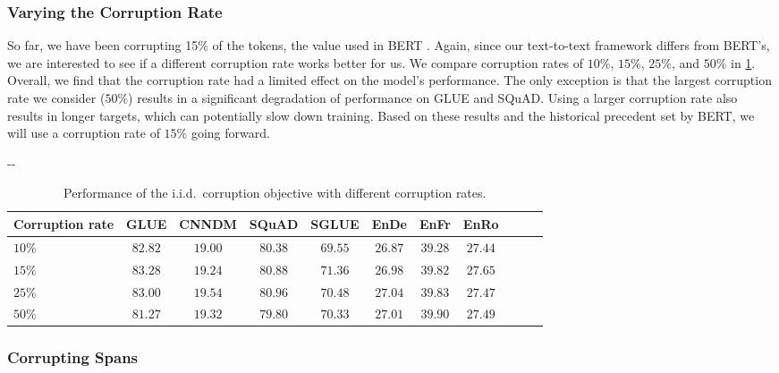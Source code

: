 \documentclass[twoside,11pt]{article}
\newlength{\offsetpage}
\newenvironment{widepage}{\begin{adjustwidth}{-\offsetpage}{-\offsetpage}
    \addtolength{\textwidth}{2\offsetpage}}
{\end{adjustwidth}}
\newcommand{\bsl}{\makebox[0pt][r]{\raisebox{0.05em}{$\bigstar\,$}}}
\def\*#1{\mathbf{#1}}
\begin{document}
\subsubsection{Varying the Corruption Rate}
\label{sec:corruption_rate}

So far, we have been corrupting 15\% of the tokens, the value used in BERT \citep{devlin2018bert}.
Again, since our text-to-text framework differs from BERT's, we are interested to see if a different corruption rate works better for us.
We compare corruption rates of $10\%$, $15\%$, $25\%$, and $50\%$ in \cref{tab:objectives_rate}.
Overall, we find that the corruption rate had a limited effect on the model's performance.
The only exception is that the largest corruption rate we consider ($50\%$) results in a significant degradation of performance on GLUE and SQuAD.
Using a larger corruption rate also results in longer targets, which can potentially slow down training.
Based on these results and the historical precedent set by BERT, we will use a corruption rate of $15\%$ going forward.

\begin{table}
\footnotesize
\begin{widepage}
\centering
\begin{tabular}{l c c c c c c c c c c}
\toprule
    Corruption rate & GLUE        & CNNDM       & SQuAD       & SGLUE       & EnDe        & EnFr        & EnRo    \\
\midrule
    $10\%$          & $\*{82.82}$ & $19.00$     & $\*{80.38}$ & $69.55$     & $\*{26.87}$ & $39.28$     & $\*{27.44}$ \\
    \bsl $15\%$     & $\*{83.28}$ & $19.24$     & $\*{80.88}$ & $\*{71.36}$ & $\*{26.98}$ & $\*{39.82}$ & $\*{27.65}$ \\
    $25\%$          & $\*{83.00}$ & $\*{19.54}$ & $\*{80.96}$ & $70.48$     & $\*{27.04}$ & $\*{39.83}$ & $\*{27.47}$ \\
    $50\%$          & $81.27$     & $19.32$     & $79.80$     & $70.33$     & $\*{27.01}$ & $\*{39.90}$ & $\*{27.49}$ \\
\bottomrule
\end{tabular}
\end{widepage}
\caption{
Performance of the i.i.d.\ corruption objective with different corruption rates.
}
\label{tab:objectives_rate}
\end{table}

\subsubsection{Corrupting Spans}
\label{sec:objective_spans}
\end{document}
